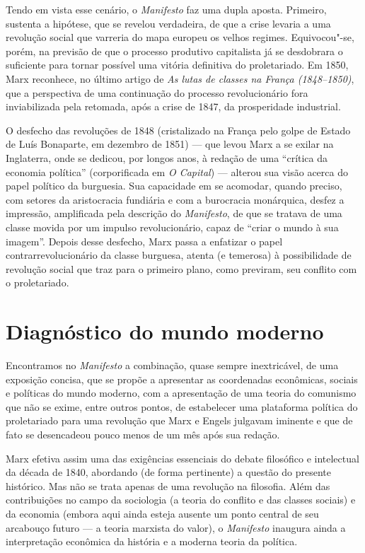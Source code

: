 Tendo em vista esse cenário, o \textit{Manifesto} faz uma dupla aposta.
Primeiro, sustenta a hipótese, que se revelou verdadeira, de que a
crise levaria a uma revolução social que varreria do mapa europeu os
velhos regimes. Equivocou"-se, porém, na previsão de que o processo
produtivo capitalista já se desdobrara o suficiente para tornar
possível uma vitória definitiva do proletariado. Em 1850, Marx reconhece, no último artigo de\textit{ As lutas de classes na França 
(1848--1850)}, que a perspectiva de uma continuação do processo
revolucionário fora inviabilizada pela retomada, após a crise de 1847,
da prosperidade industrial.

O desfecho das revoluções de 1848 (cristalizado na França pelo golpe de
Estado de Luís Bonaparte, em dezembro de 1851) --- que levou Marx a se
exilar na Inglaterra, onde se dedicou, por longos anos, à redação de
uma “crítica da economia política” (corporificada em \textit{O
Capital}) --- alterou sua visão acerca do papel político da burguesia.
Sua capacidade em se acomodar, quando preciso, com setores da
aristocracia fundiária e com a burocracia monárquica, desfez a
impressão, amplificada pela descrição do \textit{Manifesto}, de que se
tratava de uma classe movida por um impulso revolucionário, capaz de
“criar o mundo à sua imagem”. Depois desse desfecho, Marx passa a
enfatizar o papel contrarrevolucionário da classe burguesa, atenta (e
temerosa) à possibilidade de revolução social que traz para o primeiro
plano, como previram, seu conflito com o proletariado.

\section*{Diagnóstico do mundo moderno}

Encontramos no \textit{Manifesto} a combinação, quase sempre
inextricável, de uma exposição concisa, que se propõe a apresentar as
coordenadas econômicas, sociais e políticas do mundo moderno, com a
apresentação de uma teoria do comunismo que não se exime, entre outros
pontos, de estabelecer uma plataforma política do proletariado para uma
revolução que Marx e Engels julgavam iminente e que de fato se
desencadeou pouco menos de um mês após sua redação.

Marx efetiva assim uma das exigências essenciais do debate filosófico e
intelectual da década de 1840, abordando (de forma pertinente) a
questão do presente histórico. Mas não se trata apenas de uma revolução
na filosofia. Além das contribuições no campo da sociologia (a teoria
do conflito e das classes sociais) e da economia (embora aqui ainda
esteja ausente um ponto central de seu arcabouço futuro --- a teoria
marxista do valor), o \textit{Manifesto} inaugura ainda a
interpretação econômica da história e a moderna teoria da política.


